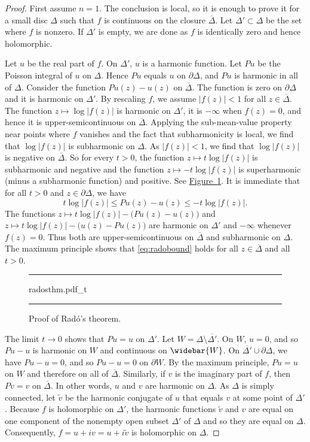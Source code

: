 \documentclass[12pt,openany]{book}
\newcommand{\sabs}[1]{\lvert {#1} \rvert}
\newcommand{\abs}[1]{\left\lvert {#1} \right\rvert}
\theoremstyle{plain}
\theoremstyle{remark}
\theoremstyle{definition}
\newenvironment{myfig}{%
\begin{figure}[h!t]
\noindent\rule{\textwidth}{0.5pt}\vspace{12pt}\par\centering}%
{\par\noindent\rule{\textwidth}{0.5pt}
\end{figure}}
\theoremstyle{exercise}
\theoremstyle{example}
\newcommand{\figureref}[1]{\hyperref[#1]{Figure~\ref*{#1}}}
\begin{document}
\begin{proof}
First assume $n=1$.  The conclusion is local, so it is
enough to prove it for a small disc $\Delta$ such that $f$ is continuous
on the closure $\overline{\Delta}$.  Let $\Delta' \subset \Delta$ be the set
where $f$ is nonzero.  If $\Delta'$ is empty, we are done as
$f$ is identically zero and hence holomorphic.

Let $u$ be the real part of $f$.  On $\Delta'$, $u$ is a harmonic function.
Let $Pu$ be the Poisson integral of $u$ on $\Delta$.  Hence $Pu$
equals $u$ on $\partial \Delta$, and $Pu$ is harmonic in all of $\Delta$.
Consider the function
$Pu(z) - u(z)$ on $\overline{\Delta}$.  The function is zero
on $\partial \Delta$ and it is harmonic on $\Delta'$.  By rescaling $f$,
we assume $\abs{f(z)} < 1$ for all $z \in \overline{\Delta}$.
The function $z \mapsto \log \sabs{f(z)}$ is harmonic on $\Delta'$, it is
$-\infty$ when $f(z) = 0$, and hence it is upper-semicontinuous on
$\overline{\Delta}$.
Applying
the sub-mean-value property near points where $f$ vanishes
and the fact that subharmonicity is local, we find that
$\log \sabs{f(z)}$ is subharmonic on $\Delta$.
As $\sabs{f(z)} < 1$, we find that
$\log \sabs{f(z)}$ is negative on $\overline{\Delta}$.
So for every $t > 0$,
the function
$z \mapsto t \log \abs{f(z)}$ is subharmonic and negative
and the function
$z \mapsto -t \log \abs{f(z)}$ is superharmonic
(minus a subharmonic function) and positive.
See \figureref{fig:radosthm}.
It is immediate that for all $t > 0$ and
$z \in \partial \Delta$,
we have
\begin{equation} \label{eq:radobound}
t \log \abs{f(z)} \leq Pu(z)-u(z) \leq -t \log \abs{f(z)}  .
\end{equation}
The functions
$z \mapsto t \log \abs{f(z)} - \bigl(Pu(z)-u(z)\bigr)$
and
$z \mapsto t \log \abs{f(z)} - \bigl(u(z)-Pu(z)\bigr)$
are harmonic on $\Delta'$ and $-\infty$ whenever $f(z)=0$.
Thus both are upper-semicontinuous on $\overline{\Delta}$
and subharmonic on $\Delta$.
The maximum principle shows that
\eqref{eq:radobound} holds
for all $z \in \overline{\Delta}$ and all $t > 0$.

\begin{myfig}
{radosthm.pdf_t}
\caption{Proof of Rad\'o's theorem.\label{fig:radosthm}}
\end{myfig}

The limit
$t \to 0$ shows that $Pu = u$ on $\Delta'$.
Let $W = \Delta \setminus \overline{\Delta'}$.
On $W$, $u=0$, and so $Pu-u$ is harmonic on $W$
and continuous on $\widebar{W}$.
On $\overline{\Delta'} \cup \partial \Delta$,
we have
$Pu-u=0$,
and so $Pu-u=0$ on $\partial W$.  By the maximum principle, $Pu=u$ on $W$
and therefore on all of $\overline{\Delta}$.
Similarly, if $v$ is the imaginary part of $f$, then $Pv = v$ on
$\overline{\Delta}$.
In other words, $u$ and $v$ are harmonic on $\Delta$.
As $\Delta$ is simply connected,
let $\tilde{v}$ be the harmonic conjugate of $u$ that equals $v$ at
some point of $\Delta'$.  Because $f$ is holomorphic on $\Delta'$,
the harmonic functions $\tilde{v}$ and $v$
are equal on one component of the nonempty open subset $\Delta'$ of $\Delta$ and so
they are equal on $\Delta$.  Consequently, $f = u +iv = u + i \tilde{v}$ is holomorphic on
$\Delta$.


\end{proof}
\end{document}
